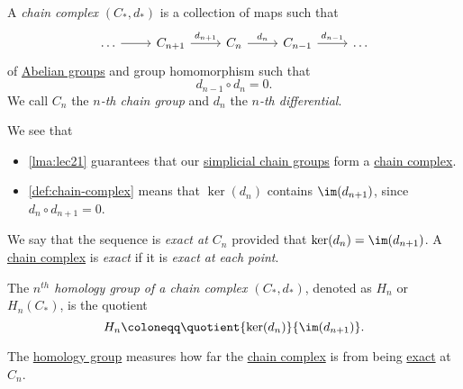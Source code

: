 \begin{definition}\label{def:chain-complex}
	A \emph{chain complex} \((C_\ast, d_\ast)\) is a collection of maps such that
	\[
		\begin{tikzcd}
			\ldots & {C_{n+1}} & {C_{n}} & {C_{n-1}} & \ldots
			\arrow[from=1-1, to=1-2]
			\arrow["{d_{n+1}}", from=1-2, to=1-3]
			\arrow["{d_{n}}", from=1-3, to=1-4]
			\arrow["{d_{n-1}}", from=1-4, to=1-5]
		\end{tikzcd}
	\]
	of \hyperref[def:Abelian-group]{Abelian groups} and group homomorphism such that
	\[
		d_{n-1}\circ d_n = 0.
	\]
	We call \(C_{n} \) the \emph{\(n\)-th chain group} and \(d_{n} \) the \emph{\(n\)-th differential}.
\end{definition}
\begin{remark}
	We see that
	\begin{itemize}
		\item \autoref{lma:lec21} guarantees that our \hyperref[def:chain-group]{simplicial chain groups} form a \hyperref[def:chain-complex]{chain complex}.
		\item \autoref{def:chain-complex} means that \(\ker (d_{n} ) \) contains \(\im  (d_{n+1})\), since \(d_{n} \circ d_{n+1} = 0\).
	\end{itemize}
\end{remark}

\begin{definition}[Exact]\label{def:exact}
	We say that the sequence is \emph{exact at \(C_{n} \)} provided that \(\ker (d_{n}) = \im (d_{n+1})\). A \hyperref[def:chain-complex]{chain complex} is \emph{exact}
	if it is \emph{exact at each point}.
\end{definition}

\begin{definition}\label{def:homology-group}
	The \emph{\(n^{th} \) homology group of a chain complex \((C_\ast, d_\ast)\)}, denoted as \(H_{n} \) or \(H_{n} (C_\ast)\), is the quotient
	\[
		H_{n} \coloneqq \quotient{\ker  (d_{n} )}{\im  (d_{n+1})}.
	\]
\end{definition}
\begin{remark}
	The \hyperref[def:homology-group]{homology group} measures how far the \hyperref[def:chain-complex]{chain complex} is from being \hyperref[def:exact]{exact} at \(C_{n} \).
\end{remark}

